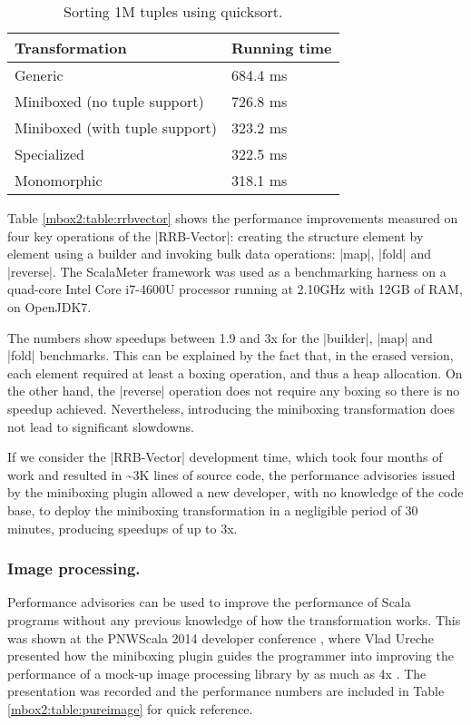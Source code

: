 \begin{table}[t]
  \begin{tabularx}{0.48\textwidth}{|g *{1}{|Y}|} \hline
    \textbf{Transformation} & \textbf{Running time}  \\ \hline
    Generic                        &              684.4 ms  \\
    Miniboxed (no tuple support)   &              726.8 ms  \\
    Miniboxed (with tuple support) &              323.2 ms  \\
    Specialized                    &              322.5 ms  \\
    Monomorphic                    &              318.1 ms  \\ \hline
  \end{tabularx}

  \caption{Sorting 1M tuples using quicksort.}
  \label{mbox2:table:tuple}

\end{table}


Table \ref{mbox2:table:rrbvector} shows the performance improvements measured on four key operations of the |RRB-Vector|: creating the structure element by element using a builder and invoking bulk data operations: |map|, |fold| and |reverse|. The ScalaMeter framework \cite{scalameter} was used as a benchmarking harness on a quad-core Intel Core i7-4600U processor running at 2.10GHz with 12GB of RAM, on OpenJDK7. %

The numbers show speedups between 1.9 and 3x for the |builder|, |map| and |fold| benchmarks. This can be explained by the fact that, in the erased version, each element required at least a boxing operation, and thus a heap allocation. On the other hand, the |reverse| operation does not require any boxing so there is no speedup achieved. Nevertheless, introducing the miniboxing transformation does not lead to significant slowdowns.

If we consider the |RRB-Vector| development time, which took four months of work and resulted in \textasciitilde3K lines of source code, the performance advisories issued by the miniboxing plugin allowed a new developer, with no knowledge of the code base, to deploy the miniboxing transformation in a negligible period of 30 minutes, producing speedups of up to 3x.



\subsubsection*{Image processing.} Performance advisories can be used to improve the performance of Scala programs without any previous knowledge of how the transformation works. This was shown at the PNWScala 2014 developer conference \cite{pnwscala-conf}, where Vlad Ureche presented how the miniboxing plugin guides the programmer into improving the performance of a mock-up image processing library by as much as 4x \cite{pnwscala-pureimage}. The presentation was recorded and the performance numbers are included in Table \ref{mbox2:table:pureimage} for quick reference.



